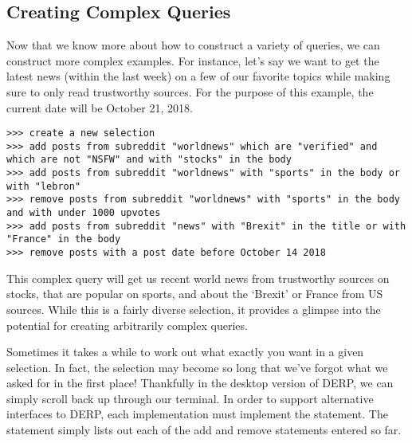 \subsection{Creating Complex Queries}

Now that we know more about how to construct a variety of queries, we can construct more complex examples. For instance, let’s say we want to get the latest news (within the last week) on a few of our favorite topics while making sure to only read trustworthy sources. For the purpose of this example, the current date will be October 21, 2018.
\newline\begin{minipage}{\linewidth}\begin{lstlisting}
>>> create a new selection
>>> add posts from subreddit "worldnews" which are "verified" and which are not "NSFW" and with "stocks" in the body
>>> add posts from subreddit "worldnews" with "sports" in the body or with "lebron"
>>> remove posts from subreddit "worldnews" with "sports" in the body and with under 1000 upvotes
>>> add posts from subreddit "news" with "Brexit" in the title or with "France" in the body
>>> remove posts with a post date before October 14 2018
\end{lstlisting}\end{minipage}
This complex query will get us recent world news from trustworthy sources on stocks, that are popular on sports, and about the ‘Brexit’ or France from US sources. While this is a fairly diverse selection, it provides a glimpse into the potential for creating arbitrarily complex queries.

Sometimes it takes a while to work out what exactly you want in a given selection. In fact, the selection may become so long that we’ve forgot what we asked for in the first place! Thankfully in the desktop version of DERP, we can simply scroll back up through our terminal. In order to support alternative interfaces to DERP, each implementation must implement the  statement. The  statement simply lists out each of the add and remove statements entered so far.
